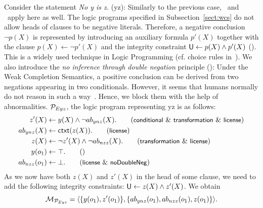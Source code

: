 \documentclass[12pt]{article}
\begin{document}
Consider the statement \textit{No y is z.} ({\ME yz}):
Similarly to the previous case, \licenses\ and \ apply here
as well.
The logic programs specified in Subsection~\ref{sect:wcs} 
do not allow heads of clauses to be negative literals. Therefore, a negative conclusion~$\neg p(X)$ is represented
by introducing an auxiliary formula $p'(X)$ together with the clause $p(X) \leftarrow \neg p'(X)$ and the integrity constraint $\mathsf{U} \leftarrow p(X) \wedge p'(X)$ (\transformation). This is a widely used technique in Logic Programming (cf. choice rules in~\cite{GebserKaminskiKaufmannSchaub12}). 
We also introduce the \emph{no inference through double negation} principle (\dnegation): Under the Weak Completion Semantics, a positive conclusion can be derived from two negations appearing in two conditionals. However, it seems that humans normally do not reason in such a way~\cite{khemlani:2012}. Hence, we block them with the help of abnormalities. ${\cal P}_{Eyz}$, the logic program representing \ME yz is as follows:
\begin{align}
 z'(X) & \leftarrow y(X) \wedge \neg \Ab_{ynz}(X).  \tag{\conditionals\ \&\ \transformation\ \&\  \licenses} \\
\Ab_{ynz}(X)  & \leftarrow \cxt(z(X)).\tag{\licenses} \\
z(X) & \leftarrow \neg z'(X) \wedge \neg \Ab_{nzz}(X). \tag{\transformation\ \&\ \licenses} \\
y(o_1) & \leftarrow \top. \tag{} \\
\Ab_{nzz}(o_1) & \leftarrow \bot. \tag{\licenses\ \&\  \dnegation}
\end{align}
As we now have both $z(X)$ and $z'(X)$ in the head of some clause, we need to add the 
following integrity constraints: $\mathsf{U} \leftarrow z(X) \wedge
z'(X)$. We obtain 
\[{\cal M}_{{\cal P}_{Eyz}} = \langle \{y(o_1), z'(o_1)\},\{ab_{ynz}(o_1), ab_{nzz}(o_1),  z(o_1)\}
\rangle.
\]
\end{document}
